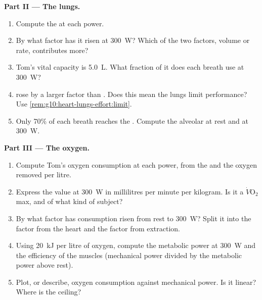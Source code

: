 \begin{problem}
\medskip
\noindent\textbf{Part II --- The lungs.}
\begin{enumerate}[resume]
  \item Compute the  at each power.
  \item By what factor has it risen at \qty{300}{W}? Which of the two
        factors, volume or rate, contributes more?
  \item Tom's vital capacity is \qty{5.0}{L}. What fraction of it does
        each breath use at \qty{300}{W}?
  \item {} rose by a larger factor than . Does
        this mean the lungs limit performance? Use
        \cref{rem:g10:heart-lungs-effort:limit}.
  \item Only 70\% of each breath reaches the . Compute the
        alveolar  at rest and at \qty{300}{W}.
\end{enumerate}

\medskip
\noindent\textbf{Part III --- The oxygen.}
\begin{enumerate}[resume]
  \item Compute Tom's oxygen consumption at each power, from the
         and the oxygen removed per litre.
  \item Express the value at \qty{300}{W} in millilitres per minute
        per kilogram. Is it a $\dot V\!\mathrm{O_2}$max, and of what
        kind of subject?
  \item By what factor has consumption risen from rest to
        \qty{300}{W}? Split it into the factor from the heart and the
        factor from extraction.
  \item Using \qty{20}{kJ} per litre of oxygen, compute the metabolic
        power at \qty{300}{W} and the efficiency of the muscles
        (mechanical power divided by the metabolic power above rest).
  \item Plot, or describe, oxygen consumption against mechanical
        power. Is it linear? Where is the ceiling?
\end{enumerate}


\end{problem}
